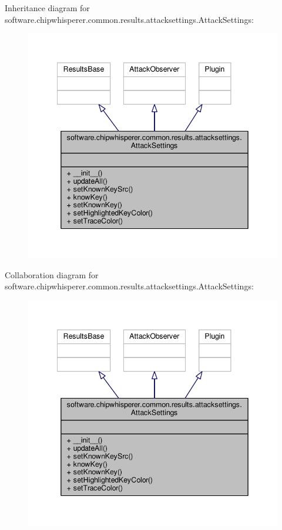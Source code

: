 Inheritance diagram for software.\+chipwhisperer.\+common.\+results.\+attacksettings.\+Attack\+Settings\+:\nopagebreak
\begin{figure}[H]
\begin{center}
\leavevmode
\includegraphics[width=342pt]{de/d94/classsoftware_1_1chipwhisperer_1_1common_1_1results_1_1attacksettings_1_1AttackSettings__inherit__graph}
\end{center}
\end{figure}


Collaboration diagram for software.\+chipwhisperer.\+common.\+results.\+attacksettings.\+Attack\+Settings\+:\nopagebreak
\begin{figure}[H]
\begin{center}
\leavevmode
\includegraphics[width=342pt]{d7/d11/classsoftware_1_1chipwhisperer_1_1common_1_1results_1_1attacksettings_1_1AttackSettings__coll__graph}
\end{center}
\end{figure}


